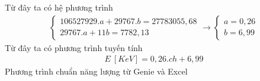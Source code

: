 \documentclass{article}
\begin{document}
Từ đây ta có hệ phương trình
\begin{align*}
	\begin{cases}
	106527929.a + 29767.b = 27783055,68 \\ 
	29767.a + 11b =  7782,13
	\end{cases}
	\rightarrow
	\begin{cases}
	a = 0,26 \\
	b = 6,99
	\end{cases}
\end{align*}
Từ đây ta có phương trình tuyến tính
\begin{align}
	E \ [KeV] = 0,26.ch + 6,99
\end{align}
Phương trình chuẩn năng lượng từ Genie và Excel
\begin{figure}[ht]
  \centering
\end{figure}
\begin{figure}[ht]
  \centering
\end{figure}
%
\newpage
\end{document}
